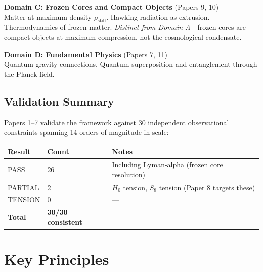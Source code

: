 \documentclass[11pt,a4paper]{article}
\newcommand{\rhostiff}{\ensuremath{\rho_{\mathrm{stiff}}}}
\begin{document}
\textbf{Domain C: Frozen Cores and Compact Objects} (Papers 9, 10)\\
Matter at maximum density $\rhostiff$. Hawking radiation as extrusion. Thermodynamics of frozen matter. \emph{Distinct from Domain A}---frozen cores are compact objects at maximum compression, not the cosmological condensate.

\textbf{Domain D: Fundamental Physics} (Papers 7, 11)\\
Quantum gravity connections. Quantum superposition and entanglement through the Planck field.

\subsection{Validation Summary}

Papers 1--7 validate the framework against 30 independent observational constraints spanning 14 orders of magnitude in scale:

\begin{center}
\begin{tabular}{lll}
\toprule
\textbf{Result} & \textbf{Count} & \textbf{Notes} \\
\midrule
PASS & 26 & Including Lyman-alpha (frozen core resolution) \\
PARTIAL & 2 & $H_0$ tension, $S_8$ tension (Paper 8 targets these) \\
TENSION & 0 & --- \\
\midrule
\textbf{Total} & \textbf{30/30 consistent} & \\
\bottomrule
\end{tabular}
\end{center}

\section{Key Principles}
\label{sec:principles}
\end{document}

